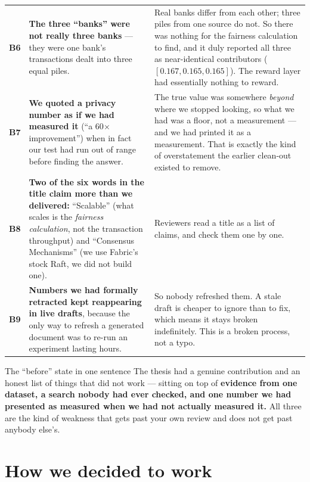 \documentclass[11pt]{article}
\newcommand{\x}{\ensuremath{\times}}
\begin{document}
{\begin{xltabular}{\linewidth}{@{}p{0.4cm} >{\raggedright\arraybackslash}p{4.9cm} X@{}}
\textbf{B6} & \textbf{The three ``banks'' were not really three banks} --- they were one bank's transactions dealt into three equal piles. & Real banks differ from each other; three piles from one source do not. So there was nothing for the fairness calculation to find, and it duly reported all three as near-identical contributors ($[0.167, 0.165, 0.165]$). The reward layer had essentially nothing to reward. \\
\textbf{B7} & \textbf{We quoted a privacy number as if we had measured it} (``a 60\x{} improvement'') when in fact our test had run out of range before finding the answer. & The true value was somewhere \emph{beyond} where we stopped looking, so what we had was a floor, not a measurement --- and we had printed it as a measurement. That is exactly the kind of overstatement the earlier clean-out existed to remove. \\
\textbf{B8} & \textbf{Two of the six words in the title claim more than we delivered:} ``Scalable'' (what scales is the \emph{fairness calculation}, not the transaction throughput) and ``Consensus Mechanisms'' (we use Fabric's stock Raft, we did not build one). & Reviewers read a title as a list of claims, and check them one by one. \\
\textbf{B9} & \textbf{Numbers we had formally retracted kept reappearing in live drafts}, because the only way to refresh a generated document was to re-run an experiment lasting hours. & So nobody refreshed them. A stale draft is cheaper to ignore than to fix, which means it stays broken indefinitely. This is a broken process, not a typo. \\
\bottomrule
\end{xltabular}}

\begin{keybox}{The ``before'' state in one sentence}
The thesis had a genuine contribution and an honest list of things that did not work --- sitting on top
of \textbf{evidence from one dataset, a search nobody had ever checked, and one number we had presented
as measured when we had not actually measured it.} All three are the kind of weakness that gets past
your own review and does not get past anybody else's.
\end{keybox}

\section{How we decided to work}
\label{sec:method}
\end{document}
